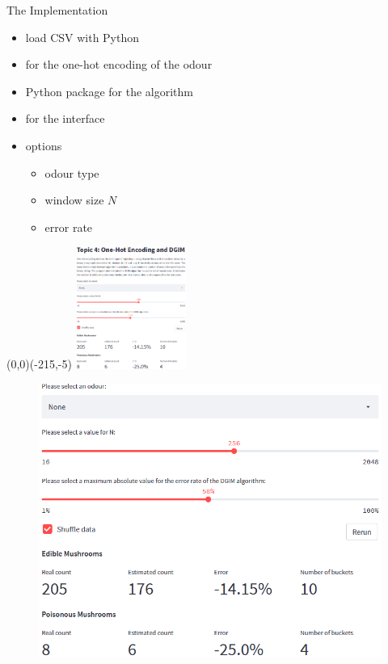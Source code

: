 \begin{frame}{The Implementation}
	\begin{itemize}
		\item
		load CSV with Python

		\item
		 for the one-hot encoding of the odour
		
		\item
		Python package  for the algorithm
		
		\item
		 for the interface
		
		\item
		options
		\begin{itemize}
			\item
			odour type
			
			\item
			window size $N$
			
			\item
			error rate
		\end{itemize}
	\end{itemize}

	\begin{picture}(0,0)(-215,-5)
		\includegraphics[height=4cm]{images/overview.png}
	\end{picture}
\end{frame}

\begin{frame}[plain]{}
	\begin{figure}
		\includegraphics[height=.75\linewidth]{images/typical1.png}
	\end{figure}
\end{frame}

